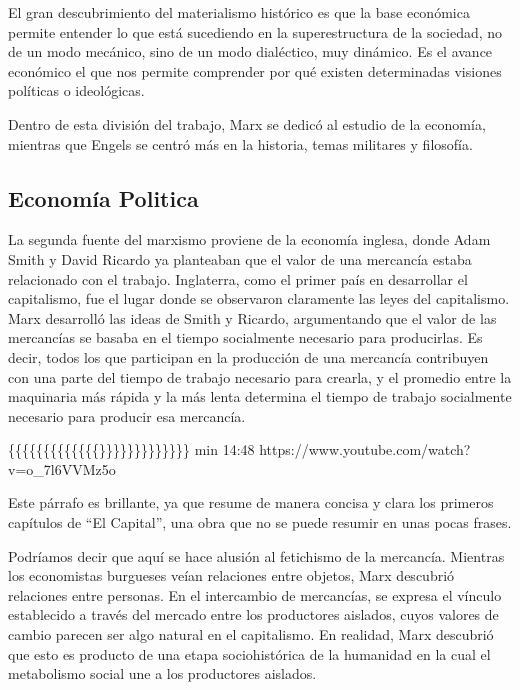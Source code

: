\documentclass[
  a4paper,
]{article}
\begin{document}
El gran descubrimiento del materialismo histórico es que la base
económica permite entender lo que está sucediendo en la superestructura
de la sociedad, no de un modo mecánico, sino de un modo dialéctico, muy
dinámico. Es el avance económico el que nos permite comprender por qué
existen determinadas visiones políticas o ideológicas.

Dentro de esta división del trabajo, Marx se dedicó al estudio de la
economía, mientras que Engels se centró más en la historia, temas
militares y filosofía.

\subsection{Economía Politica}\label{economuxeda-politica}

La segunda fuente del marxismo proviene de la economía inglesa, donde
Adam Smith y David Ricardo ya planteaban que el valor de una mercancía
estaba relacionado con el trabajo. Inglaterra, como el primer país en
desarrollar el capitalismo, fue el lugar donde se observaron claramente
las leyes del capitalismo. Marx desarrolló las ideas de Smith y Ricardo,
argumentando que el valor de las mercancías se basaba en el tiempo
socialmente necesario para producirlas. Es decir, todos los que
participan en la producción de una mercancía contribuyen con una parte
del tiempo de trabajo necesario para crearla, y el promedio entre la
maquinaria más rápida y la más lenta determina el tiempo de trabajo
socialmente necesario para producir esa mercancía.

\{\{\{\{\{\{\{\{\{\{\{\{\{\}\}\}\}\}\}\}\}\}\}\}\}\} min 14:48
https://www.youtube.com/watch?v=o\_7l6VVMz5o

Este párrafo es brillante, ya que resume de manera concisa y clara los
primeros capítulos de ``El Capital'', una obra que no se puede resumir
en unas pocas frases.

Podríamos decir que aquí se hace alusión al fetichismo de la mercancía.
Mientras los economistas burgueses veían relaciones entre objetos, Marx
descubrió relaciones entre personas. En el intercambio de mercancías, se
expresa el vínculo establecido a través del mercado entre los
productores aislados, cuyos valores de cambio parecen ser algo natural
en el capitalismo. En realidad, Marx descubrió que esto es producto de
una etapa sociohistórica de la humanidad en la cual el metabolismo
social une a los productores aislados.
\end{document}

